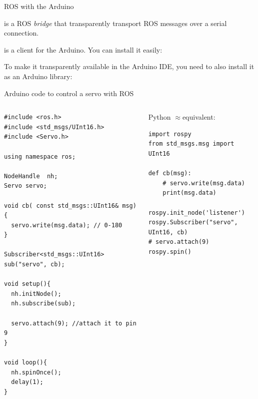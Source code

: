 \documentclass[compress]{beamer}
\begin{document}
\begin{frame}[fragile]{ROS with the Arduino}

     is a ROS \emph{bridge} that transparently transport ROS messages
    over a serial connection.

     is a  client for the Arduino.
    You can install it easily:\\

    To make it transparently available in the Arduino IDE, you need to also
    install it as an Arduino library:

\end{frame}


\begin{frame}[fragile]{Arduino code to control a servo with ROS}
\begin{columns}
    \begin{column}{0.5\linewidth}
        
\begin{verbatim}
#include <ros.h>
#include <std_msgs/UInt16.h>
#include <Servo.h> 

using namespace ros;

NodeHandle  nh;
Servo servo;

void cb( const std_msgs::UInt16& msg){
  servo.write(msg.data); // 0-180
}

Subscriber<std_msgs::UInt16> sub("servo", cb);

void setup(){
  nh.initNode();
  nh.subscribe(sub);

  servo.attach(9); //attach it to pin 9
}

void loop(){
  nh.spinOnce();
  delay(1);
}
\end{verbatim}
    \end{column}
    \begin{column}{0.5\linewidth}

        \small Python $\approx$equivalent:

\begin{verbatim}
import rospy
from std_msgs.msg import UInt16

def cb(msg):
    # servo.write(msg.data)
    print(msg.data)

rospy.init_node('listener')
rospy.Subscriber("servo", UInt16, cb)
# servo.attach(9)
rospy.spin()
\end{verbatim}
    \end{column}
\end{columns}
\end{frame}
\end{document}
